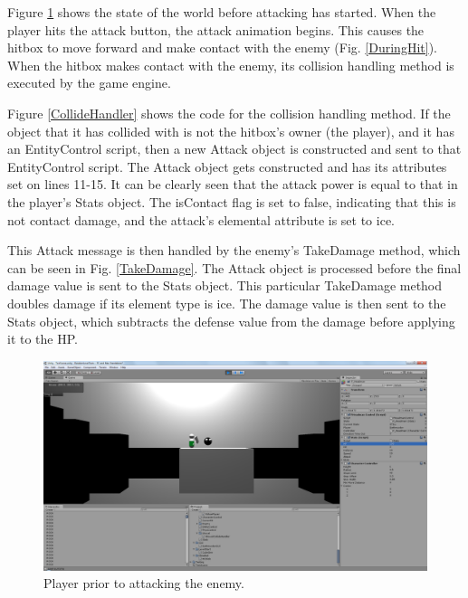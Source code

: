 \documentclass{article}
\begin{document}
Figure \ref{PreHit} shows the state of the world before attacking has started.  When the player hits the attack button, the attack animation begins.  This causes the hitbox to move forward and make contact with the enemy (Fig. \ref{DuringHit}).  When the hitbox makes contact with the enemy, its collision handling method is executed by the game engine.

Figure \ref{CollideHandler} shows the code for the collision handling method.  If the object that it has collided with is not the hitbox's owner (the player), and it has an EntityControl script, then a new Attack object is constructed and sent to that EntityControl script.  The Attack object gets constructed and has its attributes set on lines 11-15.  It can be clearly seen that the attack power is equal to that in the player's Stats object.  The isContact flag is set to false, indicating that this is not contact damage, and the attack's elemental attribute is set to ice.

This Attack message is then handled by the enemy's TakeDamage method, which can be seen in Fig. \ref{TakeDamage}.  The Attack object is processed before the final damage value is sent to the Stats object.  This particular TakeDamage method doubles damage if its element type is ice.  The damage value is then sent to the Stats object, which subtracts the defense value from the damage before applying it to the HP.

\begin{figure}[h!]

\includegraphics[width=5in]{Graphics/Pre_Hit.png}
\caption{Player prior to attacking the enemy.}
\label{PreHit}

\end{figure}
\end{document}
